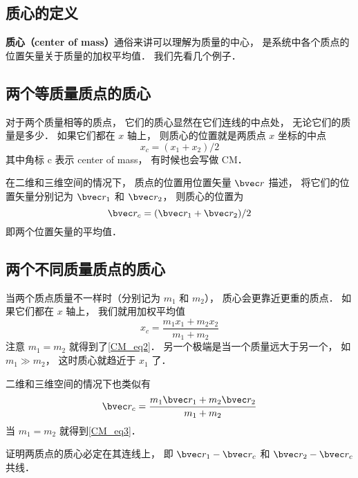 

\subsection{质心的定义}
\textbf{质心（center of mass）}通俗来讲可以理解为质量的中心， 是系统中各个质点的位置矢量关于质量的加权平均值． 我们先看几个例子．

\subsection{两个等质量质点的质心}
对于两个质量相等的质点， 它们的质心显然在它们连线的中点处， 无论它们的质量是多少． 如果它们都在 $x$ 轴上， 则质心的位置就是两质点 $x$ 坐标的中点
\begin{equation}\label{CM_eq2}
x_c = (x_1 + x_2)/2
\end{equation}
其中角标 c 表示 center of mass， 有时候也会写做 CM．

在二维和三维空间的情况下， 质点的位置用位置矢量 $\bvec r$ 描述， 将它们的位置矢量分别记为 $\bvec r_1$ 和 $\bvec r_2$， 则质心的位置为
\begin{equation}\label{CM_eq3}
\bvec r_c = (\bvec r_1 + \bvec r_2)/2
\end{equation}
即两个位置矢量的平均值． %

\subsection{两个不同质量质点的质心}
当两个质点质量不一样时（分别记为 $m_1$ 和 $m_2$）， 质心会更靠近更重的质点． 如果它们都在 $x$ 轴上， 我们就用加权平均值
\begin{equation}
x_c = \frac{m_1 x_1 + m_2 x_2}{m_1 + m_2}
\end{equation}
注意 $m_1 = m_2$ 就得到了\autoref{CM_eq2}． 另一个极端是当一个质量远大于另一个， 如 $m_1 \gg m_2$， 这时质心就趋近于 $x_1$ 了．

二维和三维空间的情况下也类似有
\begin{equation}\label{CM_eq5}
\bvec r_c = \frac{m_1 \bvec r_1 + m_2 \bvec r_2}{m_1 + m_2}
\end{equation}
当 $m_1 = m_2$ 就得到\autoref{CM_eq3}．

\begin{exercise}{}
证明两质点的质心必定在其连线上， 即 $\bvec r_1 - \bvec r_c$ 和 $\bvec r_2 - \bvec r_c$ 共线．%
\end{exercise}


